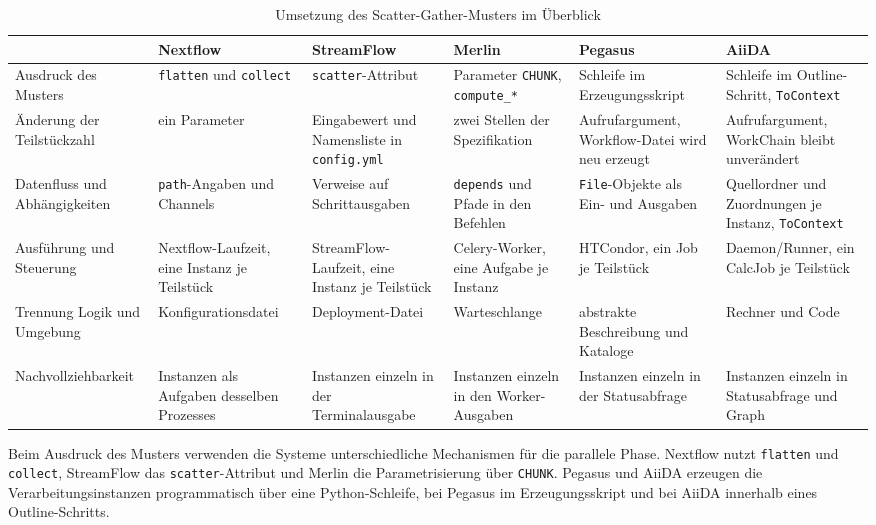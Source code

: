 \begin{table}[H]
  \caption{Umsetzung des Scatter-Gather-Musters im Überblick}
  \label{tab:sg:vergleich}
  \centering
  \scriptsize
  \setlength{\tabcolsep}{3pt}
  \renewcommand{\arraystretch}{1.4}
  \begin{tabular}{>{\raggedright\arraybackslash}p{2.7cm} >{\raggedright\arraybackslash}p{1.9cm} >{\raggedright\arraybackslash}p{1.9cm} >{\raggedright\arraybackslash}p{1.9cm} >{\raggedright\arraybackslash}p{1.9cm} >{\raggedright\arraybackslash}p{1.9cm}}
    \hline
     & \textbf{Nextflow} & \textbf{Stream\-Flow} & \textbf{Merlin} & \textbf{Pegasus} & \textbf{AiiDA} \\
    \hline
    Ausdruck des Musters & \texttt{flatten} und \texttt{collect} & \texttt{scatter}-Attribut & Parameter \texttt{CHUNK}, \texttt{compute\_*} & Schleife im Erzeugungs\-skript & Schleife im Outline-Schritt, \texttt{ToContext} \\
    Änderung der Teilstückzahl & ein Parameter & Eingabewert und Namensliste in \texttt{config.yml} & zwei Stellen der Spezifikation & Aufruf\-argument, Workflow-Datei wird neu erzeugt & Aufruf\-argument, WorkChain bleibt unverändert \\
    Datenfluss und Abhängigkeiten & \texttt{path}-Angaben und Channels & Verweise auf Schrittausgaben & \texttt{depends} und Pfade in den Befehlen & \texttt{File}-Objekte als Ein- und Ausgaben & Quellordner und Zuordnungen je Instanz, \texttt{ToContext} \\
    Ausführung und Steuerung & Nextflow-Laufzeit, eine Instanz je Teilstück & StreamFlow-Laufzeit, eine Instanz je Teilstück & Celery-Worker, eine Aufgabe je Instanz & HTCondor, ein Job je Teilstück & Daemon/Runner, ein CalcJob je Teilstück \\
    Trennung Logik und Umgebung & Konfigurations\-datei & Deployment-Datei & Warteschlange & abstrakte Beschreibung und Kataloge & Rechner und Code \\
    Nachvollziehbarkeit & Instanzen als Aufgaben desselben Prozesses & Instanzen einzeln in der Terminal\-ausgabe & Instanzen einzeln in den Worker-Ausgaben & Instanzen einzeln in der Status\-abfrage & Instanzen einzeln in Status\-abfrage und Graph \\
    \hline
  \end{tabular}
\end{table}

Beim Ausdruck des Musters verwenden die Systeme unterschiedliche
Mechanismen für die parallele Phase. Nextflow nutzt
\texttt{flatten} und \texttt{collect}, StreamFlow das
\texttt{scatter}-Attribut und Merlin die Parametrisierung über
\texttt{CHUNK}. Pegasus und AiiDA erzeugen die
Verarbeitungsinstanzen programmatisch über eine Python-Schleife,
bei Pegasus im Erzeugungsskript und bei AiiDA innerhalb eines
Outline-Schritts.

